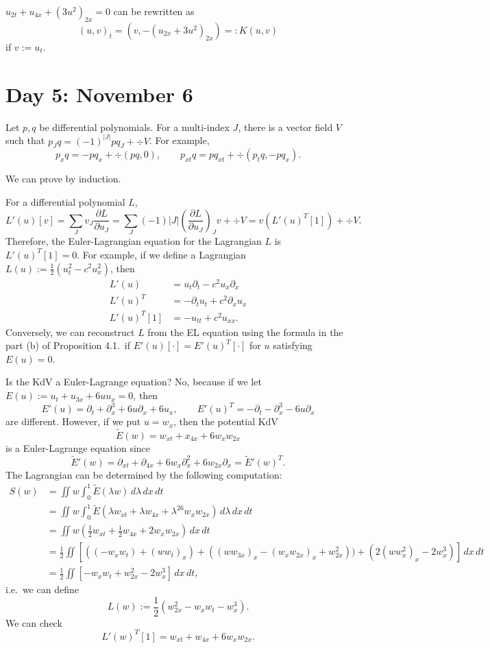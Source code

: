 \documentclass{../../../small}
\begin{document}
\begin{ex}
$u_{2t}+u_{4x}+(3u^2)_{2x}=0$ can be rewritten as
\[(u,v)_t=(v,-(u_{2x}+3u^2)_{2x})=:K(u,v)\]
if $v:=u_t$.
\end{ex}



\newpage
\section{Day 5: November 6}


\begin{lem}
Let $p,q$ be differential polynomials.
For a multi-index $J$, there is a vector field $V$ such that $p_Jq=(-1)^{|J|}pq_J+\div V$.
For example,
\[p_xq=-pq_x+\div(pq,0),\qquad p_{xt}q=pq_{xt}+\div(p_tq,-pq_x).\]
\end{lem}
\begin{pf}
We can prove by induction.
\end{pf}



For a differential polynomial $L$,
\[L'(u)[v]=\sum_Jv_J\frac{\partial L}{\partial u_J}=\sum_J(-1){|J|}\left(\frac{\partial L}{\partial u_J}\right)_Jv+\div V=v(L'(u)^T[1])+\div V.\]
Therefore, the Euler-Lagrangian equation for the Lagrangian $L$ is $L'(u)^T[1]=0$.
For example, if we define a Lagrangian $L(u):=\frac12(u_t^2-c^2u_x^2)$, then
\begin{align*}
L'(u)&=u_t\partial_t-c^2u_x\partial_x\\
L'(u)^T&=-\partial_tu_t+c^2\partial_xu_x\\
L'(u)^T[1]&=-u_{tt}+c^2u_{xx}.
\end{align*}
Conversely, we can reconstruct $L$ from the EL equation using the formula in the part (b) of Proposition 4.1.~if $E'(u)[\cdot]=E'(u)^T[\cdot]$ for $u$ satisfying $E(u)=0$.

Is the KdV a Euler-Lagrange equation?
No, because if we let $E(u):=u_t+u_{3x}+6uu_x=0$, then
\[E'(u)=\partial_t+\partial_x^3+6u\partial_x+6u_x,\qquad E'(u)^T=-\partial_t-\partial_x^3-6u\partial_x\]
are different.
However, if we put $u=w_x$, then the potential KdV
\[\tilde E(w)=w_{xt}+x_{4x}+6w_xw_{2x}\]
is a Euler-Lagrange equation since
\[\tilde E'(w)=\partial_{xt}+\partial_{4x}+6w_x\partial_x^2+6w_{2x}\partial_x=\tilde E'(w)^T.\]
The Lagrangian can be determined by the following computation:
\begin{align*}
S(w)&=\iint w\int_0^1\tilde E(\lambda w)\,d\lambda\,dx\,dt\\
&=\iint w\int_0^1\tilde E(\lambda w_{xt}+\lambda w_{4x}+\lambda^26w_xw_{2x})\,d\lambda\,dx\,dt\\
&=\iint w(\frac12w_{xt}+\frac12w_{4x}+2w_xw_{2x})\,dx\,dt\\
&=\frac12\iint\left[((-w_xw_t)+(ww_t)_x)+((ww_{3x})_x-(w_xw_{2x})_x+w_{2x}^2))+(2(ww_x^2)_x-2w_x^3)\right]\,dx\,dt\\
&=\frac12\iint\left[-w_xw_t+w_{2x}^2-2w_x^3\right]\,dx\,dt,
\end{align*}
i.e.~we can define
\[L(w):=\frac12(w_{2x}^2-w_xw_t-w_x^3).\]
We can check
\[L'(w)^T[1]=w_{xt}+w_{4x}+6w_xw_{2x}.\]
\end{document}
